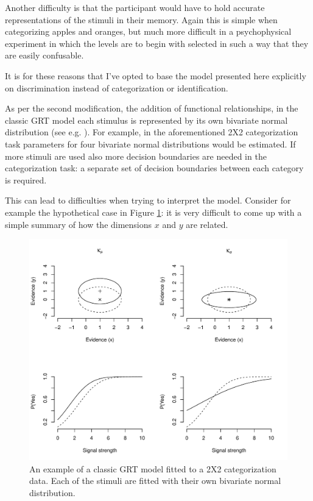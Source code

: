 \documentclass{article}\usepackage{knitr}
\begin{document}
Another difficulty is that the participant would have to hold accurate representations of the stimuli in their memory. Again this is simple when categorizing apples and oranges, but much more difficult in a psychophysical experiment in which the levels are to begin with selected in such a way that they are easily confusable. 

It is for these reasons that I've opted to base the model presented here explicitly on discrimination instead of categorization or identification.

As per the second modification, the addition of functional relationships, in the classic GRT model each stimulus is represented by its own bivariate  normal distribution (see e.g. \cite{ashby2015}). For example, in the aforementioned 2X2 categorization task parameters for four bivariate normal distributions would be estimated. If more stimuli are used also more decision boundaries are needed in the categorization task: a separate set of decision boundaries between each category is required. 

This can lead to difficulties when trying to interpret the model. Consider for example the hypothetical case in Figure \ref{fig:classicGRT}: it is very difficult to come up with a simple summary of how the dimensions $x$ and $y$ are related.

\begin{figure}[!htb]
\centering
\begin{knitrout}
\color{fgcolor}
\includegraphics[width=\maxwidth]{figure/unnamed-chunk-11-1} 

\end{knitrout}
\caption{An example of a classic GRT model fitted to a 2X2 categorization data. Each of the stimuli are fitted with their own bivariate normal distribution.}
\label{fig:classicGRT}
\end{figure} 
\end{document}
